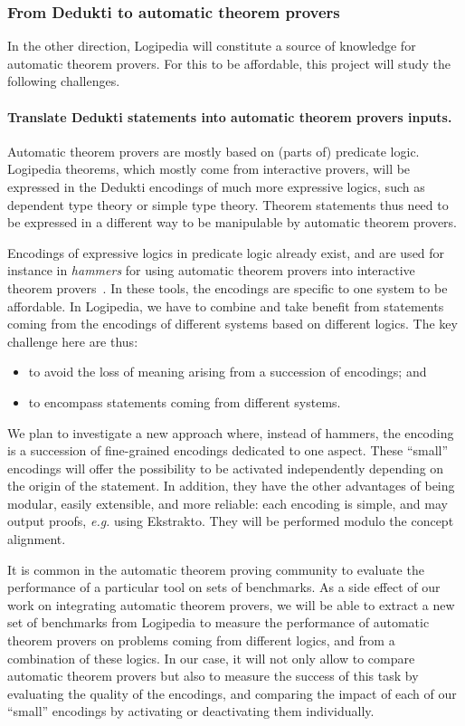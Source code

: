 \subsubsection*{From Dedukti to automatic theorem provers}

In the other direction, Logipedia will constitute a source of
knowledge for automatic theorem provers. For this to be affordable,
this project will study the following challenges.

\paragraph*{Translate Dedukti statements into automatic theorem provers
  inputs.}
Automatic theorem provers are mostly based on (parts of) predicate
logic.  Logipedia theorems, which mostly come from interactive
provers, will be expressed in the Dedukti encodings of much more
expressive logics, such as dependent type theory or simple type
theory.  Theorem statements thus need to be expressed in a different way
to be manipulable by automatic theorem provers.

Encodings of expressive logics in predicate logic already exist,
and are used for instance in {\em hammers} for using automatic theorem
provers into interactive theorem
provers~\cite{DBLP:conf/lpar/PaulsonB10,DBLP:journals/jar/CzajkaK18}.
In these tools, the encodings are specific to one system to be
affordable. In Logipedia, we have to combine and take benefit from
statements coming from the encodings of different systems based on
different logics. The key challenge here are thus:
\begin{itemize}
\item to avoid the loss of meaning arising from a succession of
  encodings; and
  \item to encompass statements coming from different systems.
\end{itemize}

We plan to investigate a new approach where, instead of hammers, the
encoding is a succession of fine-grained encodings dedicated to one
aspect. These ``small'' encodings will offer the possibility to be
activated independently depending on the origin of the statement. In
addition, they have the other advantages of being modular, easily
extensible, and more reliable: each encoding is simple, and may output
proofs, {\em e.g.} using Ekstrakto. They will be performed modulo the
concept alignment.

It is common in the automatic theorem proving community to evaluate
the performance of a particular tool on sets of benchmarks. As a side
effect of our work on integrating automatic theorem provers, we will
be able to extract a new set of benchmarks from Logipedia to measure
the performance of automatic theorem provers on problems coming from
different logics, and from a combination of these logics. In our case,
it will not only allow to compare automatic theorem provers but also
to measure the success of this task by evaluating the quality of the
encodings, and comparing the impact of each of our ``small'' encodings
by activating or deactivating them individually.

